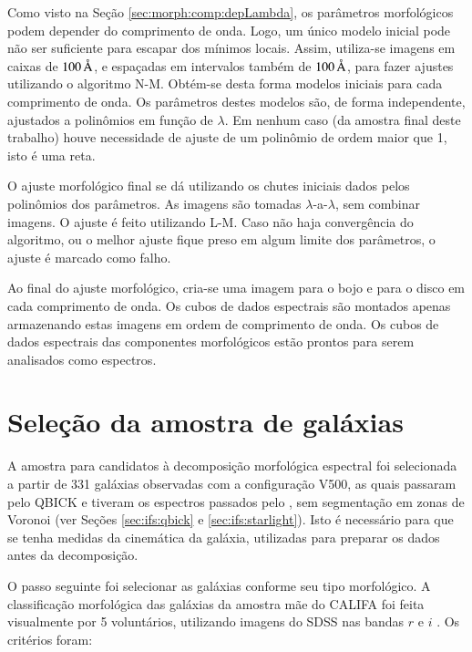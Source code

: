 Como visto na Seção \ref{sec:morph:comp:depLambda}, os parâmetros morfológicos
podem depender do comprimento de onda. Logo, um único modelo inicial pode não
ser suficiente para escapar dos mínimos locais. Assim, utiliza-se imagens em
caixas de $100\,\text{\normalfont\AA}$, e espaçadas em intervalos também de
$100\,\text{\normalfont\AA}$, para fazer ajustes utilizando o algoritmo N-M. Obtém-se desta
forma modelos iniciais para cada comprimento de onda. Os parâmetros destes
modelos são, de forma independente, ajustados a polinômios em função de
$\lambda$. Em nenhum caso (da amostra final deste trabalho) houve necessidade de
ajuste de um polinômio de ordem maior que 1, isto é uma reta.

O ajuste morfológico final se dá utilizando os chutes iniciais dados pelos
polinômios dos parâmetros. As imagens são tomadas $\lambda$-a-$\lambda$, sem
combinar imagens. O ajuste é feito utilizando L-M. Caso não haja convergência do
algoritmo, ou o melhor ajuste fique preso em algum limite dos parâmetros, o
ajuste é marcado como falho.

Ao final do ajuste morfológico, cria-se uma imagem para o bojo e para o disco em
cada comprimento de onda. Os cubos de dados espectrais são montados apenas
armazenando estas imagens em ordem de comprimento de onda. Os cubos de dados
espectrais das componentes morfológicos estão prontos para serem analisados como
espectros.



\section{Seleção da amostra de galáxias}

A amostra para candidatos à decomposição morfológica espectral foi selecionada a
partir de 331 galáxias observadas com a configuração V500, as quais passaram
pelo QBICK e tiveram os espectros passados pelo \starlight, sem segmentação em
zonas de Voronoi (ver Seções \ref{sec:ifs:qbick} e \ref{sec:ifs:starlight}).
Isto é necessário para que se tenha medidas da cinemática da galáxia, utilizadas
para preparar os dados antes da decomposição.

O passo seguinte foi selecionar as galáxias conforme seu tipo morfológico. A
classificação morfológica das galáxias da amostra mãe do CALIFA foi feita
visualmente por 5 voluntários, utilizando imagens do SDSS nas bandas $r$ e $i$
\citep{Walcher2014}. Os critérios foram:

